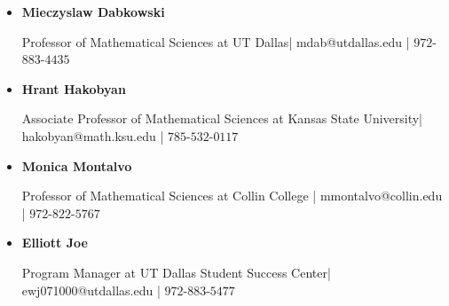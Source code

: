 \documentclass{article}
\begin{document}
\begin{itemize}
    \item {\Large \textbf{Mieczyslaw Dabkowski}} 
    
    Professor of Mathematical Sciences at UT Dallas| mdab@utdallas.edu | $972$-$883$-$4435$ \medskip

    \item {\Large \textbf{Hrant Hakobyan}} 

    Associate Professor of Mathematical Sciences at Kansas State University| hakobyan@math.ksu.edu | $785$-$532$-$0117$ \medskip

    \item {\Large \textbf{Monica Montalvo}}

    Professor of Mathematical Sciences at Collin College | mmontalvo@collin.edu | $972$-$822$-$5767$ \medskip

    \item {\Large \textbf{Elliott Joe}}

     Program Manager at UT Dallas Student Success Center| ewj071000@utdallas.edu | $972$-$883$-$5477$
    
    
\end{itemize}
\end{document}
